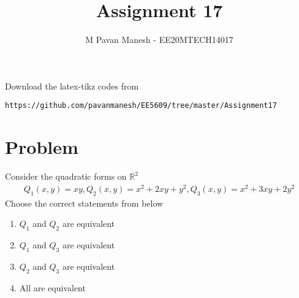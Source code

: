 \documentclass[journal,12pt]{IEEEtran}
\begin{document}
     \def\rightbox#1{\makebox[0in][r]{#1}}
     \def\centbox#1{\makebox[0in]{#1}}
     \def\topbox#1{\raisebox{-\baselineskip}[0in][0in]{#1}}
     \def\midbox#1{\raisebox{-0.5\baselineskip}[0in][0in]{#1}}
\vspace{3cm}
\title{Assignment 17}
\author{M Pavan Manesh - EE20MTECH14017}
\maketitle
\bigskip
\renewcommand{\thefigure}{\theenumi}
\renewcommand{\thetable}{\theenumi}
%
Download the latex-tikz codes from 
%
\begin{lstlisting}
https://github.com/pavanmanesh/EE5609/tree/master/Assignment17
\end{lstlisting}
\section{\textbf{Problem}}
Consider the quadratic forms on $\mathbb{R}^2$
\begin{align}
    Q_{1}(x,y)=xy,Q_{2}(x,y)=x^2+2xy+y^2,Q_{3}(x,y)=x^2+3xy+2y^2 \nonumber
\end{align}
Choose the correct statements from below
\begin{enumerate}
\item $Q_{1}$ and $Q_{2}$ are equivalent
\item $Q_{1}$ and $Q_{3}$ are equivalent
\item $Q_{2}$ and $Q_{3}$ are equivalent
\item All are equivalent
\end{enumerate}
\end{document}
